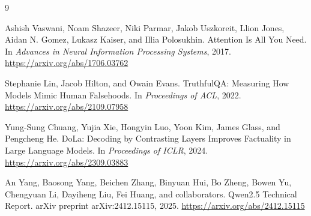 \documentclass[10pt,twocolumn]{article}
\begin{document}
\begin{thebibliography}{9}\small
\setlength{\itemsep}{0.35em}

Ashish Vaswani, Noam Shazeer, Niki Parmar, Jakob Uszkoreit, Llion Jones, Aidan N. Gomez, Lukasz Kaiser, and Illia Polosukhin.
\newblock Attention Is All You Need.
\newblock In \emph{Advances in Neural Information Processing Systems}, 2017.
\newblock \url{https://arxiv.org/abs/1706.03762}

Stephanie Lin, Jacob Hilton, and Owain Evans.
\newblock TruthfulQA: Measuring How Models Mimic Human Falsehoods.
\newblock In \emph{Proceedings of ACL}, 2022.
\newblock \url{https://arxiv.org/abs/2109.07958}

Yung-Sung Chuang, Yujia Xie, Hongyin Luo, Yoon Kim, James Glass, and Pengcheng He.
\newblock DoLa: Decoding by Contrasting Layers Improves Factuality in Large Language Models.
\newblock In \emph{Proceedings of ICLR}, 2024.
\newblock \url{https://arxiv.org/abs/2309.03883}

An Yang, Baosong Yang, Beichen Zhang, Binyuan Hui, Bo Zheng, Bowen Yu, Chengyuan Li, Dayiheng Liu, Fei Huang, and collaborators.
\newblock Qwen2.5 Technical Report.
\newblock arXiv preprint arXiv:2412.15115, 2025.
\newblock \url{https://arxiv.org/abs/2412.15115}

\end{thebibliography}
\end{document}
